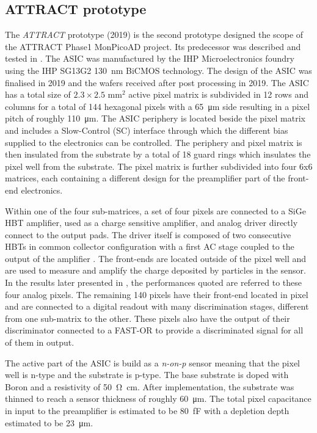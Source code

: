 		\subsection{ATTRACT prototype}
		The \textit{ATTRACT} prototype (2019) is the second prototype designed the scope of the ATTRACT Phase1 MonPicoAD project. Its predecessor was described and tested in \cite{ATTRACT_proto1, ATTRACT_proto1_50ps}. The ASIC was manufactured by the IHP Microelectronics foundry using the IHP SG13G2 \SI{130}{\nano\meter} BiCMOS technology. The design of the ASIC was finalised in 2019 and the wafers received after post processing in 2019. The ASIC has a total size of $2.3 \times 2.5$ mm$^2$ active pixel matrix is subdivided in 12 rows and columns for a total of 144 hexagonal pixels with a \SI{65}{\micro\meter} side resulting in a pixel pitch of roughly \SI{110}{\micro\meter}. The ASIC periphery is located beside the pixel matrix and includes a Slow-Control (SC) interface through which the different bias supplied to the electronics can be controlled. The periphery and pixel matrix is then insulated from the substrate by a total of 18 guard rings which insulates the pixel well from the substrate. The pixel matrix is further subdivided into four 6x6 matrices, each containing a different design for the preamplifier part of the front-end electronics.  
			
		Within one of the four sub-matrices, a set of four pixels are connected to a SiGe HBT amplifier, used as a charge sensitive amplifier, and analog driver directly connect to the output pads. The driver itself is composed of two consecutive HBTs in common collector configuration with a first AC stage coupled to the output of the amplifier \cite{ATTRACT_proto1_testbeam}. The front-ends are located outside of the pixel well and are used to measure and amplify the charge deposited by particles in the sensor. In the results later presented in , the performances quoted are referred to these four analog pixels. The remaining 140 pixels have their front-end located in pixel and are connected to a digital readout with many discrimination stages, different from one sub-matrix to the other. These pixels also have the output of their discriminator connected to a FAST-OR to provide a discriminated signal for all of them in output. 
		
		The active part of the ASIC is build as a \textit{n-on-p} sensor meaning that the pixel well is n-type and the substrate is p-type. The base substrate is doped with Boron and a resistivity of \SI{50}{\ohm \centi\meter}. After implementation, the substrate was thinned to reach a sensor thickness of roughly \SI{60}{\micro\meter}. The total pixel capacitance in input to the preamplifier is estimated to be \SI{80}{\femto\farad} with a depletion depth estimated to be \SI{23}{\micro\meter}. 
		
